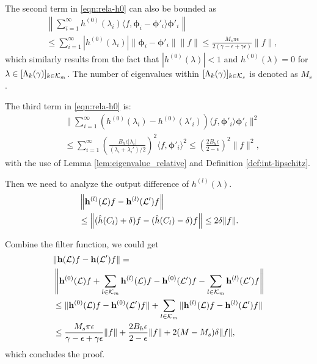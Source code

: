 The second term in \eqref{eqn:rela-h0} can also be bounded as
\begin{align}
    &\nonumber \left\|  \sum_{i =1}^\infty  h^{(0)}(\lambda_i )\langle f, \bm\phi_i - \bm\phi'_i  \rangle \bm\phi'_i \right\| \\
 &\leq   \sum_{i =1}^\infty |h^{(0)}(\lambda_i)| \|\bm\phi_i - \bm\phi'_i \| \|f\|  \leq   \frac{M_s \pi \epsilon}{2(\gamma-\epsilon+\gamma\epsilon)} \|f\|,
\end{align}
which similarly results from the fact that $|h^{(0)}(\lambda)|<1$ and $h^{(0)}(\lambda)=0$ for $\lambda\in[\Lambda_k(\gamma)]_{k\in{\ensuremath{\mathcal K}}_m}$. The number of eigenvalues within $[\Lambda_k(\gamma)]_{k\in{\ensuremath{\mathcal K}}_s}$ is denoted as $M_s$.

The third term in \eqref{eqn:rela-h0} is:
\begin{align}
   &\nonumber \Bigg\|\sum_{i=1}^\infty  (h^{(0)}(\lambda_i ) -h^{(0)}(\lambda'_i) ) \langle f, \bm\phi'_i \rangle \bm\phi'_i  \Bigg\|^2 \\
    &\leq  \sum_{i=1}^\infty\left( \frac{B_h \epsilon|\lambda_i|}{(\lambda_i+\lambda_i')/2}\right)^2   \langle f,\bm\phi'_i \rangle^2 \leq \left( \frac{2B_h\epsilon}{2-\epsilon}\right)^2\|f\|^2,
\end{align}
with the use of Lemma \ref{lem:eigenvalue_relative} and Definition \ref{def:int-lipschitz}.

Then we need to analyze the output difference of $h^{(l)}(\lambda)$.
\begin{align}
     \nonumber &\left\| {\mathbf h}^{(l)}({\mathcal L})f -{\mathbf h}^{(l)}({\mathcal L}')f \right\| 
    \\& \leq \left\| (\hat{h}(C_l)+\delta)f -(\hat{h}(C_l)-\delta)f\right\| \leq 2\delta\|f\|.
\end{align}

Combine the filter function, we could get 
\begin{align}
\label{eqn:sta-filter-gamma}
    \nonumber &\|{\mathbf h}({\mathcal L})f-{\mathbf h}({\mathcal L}')f\|=\\&
    \left\|{\mathbf h}^{(0)}({\mathcal L})f +\sum_{l\in{\ensuremath{\mathcal K}}_m}{\mathbf h}^{(l)}({\mathcal L})f - {\mathbf h}^{(0)}({\mathcal L}')f - \sum_{l\in{\ensuremath{\mathcal K}}_m} {\mathbf h}^{(l)}({\mathcal L}')f \right\|\\
    &\leq \|{\mathbf h}^{(0)}({\mathcal L})f-{\mathbf h}^{(0)}({\mathcal L}')f\|+\sum_{l\in{\ensuremath{\mathcal K}}_m}\|{\mathbf h}^{(l)}({\mathcal L})f-{\mathbf h}^{(l)}({\mathcal L}')f\|\\
    &\leq \frac{M_s\pi\epsilon}{\gamma-\epsilon+\gamma\epsilon}\|f\| + \frac{2B_h\epsilon}{2-\epsilon}\|f\| +2(M-M_s)\delta\|f\|,
\end{align}
which concludes the proof.


